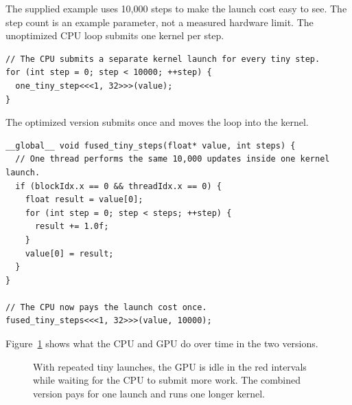 \documentclass[11pt]{article}
\numberwithin{equation}{section}
\numberwithin{figure}{section}
\numberwithin{table}{section}
\begin{document}
The supplied example uses 10,000 steps to make the launch cost easy to see.  The
step count is an example parameter, not a measured hardware limit.  The unoptimized
CPU loop submits one kernel per step.
\begin{lstlisting}[language=CUDA,numbers=none,caption={Unoptimized.  Pay the launch cost on every step.}]
// The CPU submits a separate kernel launch for every tiny step.
for (int step = 0; step < 10000; ++step) {
  one_tiny_step<<<1, 32>>>(value);
}
\end{lstlisting}
The optimized version submits once and moves the loop into the kernel.
\begin{lstlisting}[language=CUDA,numbers=none,caption={Optimized.  One launch performs all 10,000 steps.}]
__global__ void fused_tiny_steps(float* value, int steps) {
  // One thread performs the same 10,000 updates inside one kernel launch.
  if (blockIdx.x == 0 && threadIdx.x == 0) {
    float result = value[0];
    for (int step = 0; step < steps; ++step) {
      result += 1.0f;
    }
    value[0] = result;
  }
}

// The CPU now pays the launch cost once.
fused_tiny_steps<<<1, 32>>>(value, 10000);
\end{lstlisting}

Figure~\ref{fig:launch-overhead} shows what the CPU and GPU do over time in the two
versions.

\begin{figure}[htbp]
  \centering
  \caption{With repeated tiny launches, the GPU is idle in the red intervals while
  waiting for the CPU to submit more work.  The combined version pays for one
  launch and runs one longer kernel.}
  \label{fig:launch-overhead}
\end{figure}
\FloatBarrier
\end{document}
